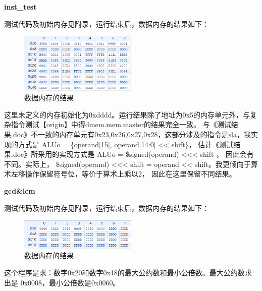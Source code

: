 \documentclass[10pt,a4paper,fleqn]{article}
\begin{document}
\par {\bf inst\_test}
\par 测试代码及初始内存见附录，运行结束后，数据内存的结果如下：
\begin{figure}[H]
  \centering
  \includegraphics[width=0.5\textwidth]{figure/simu/advance/inst.png}
  \caption{数据内存的结果}
\end{figure}
\par 这里未定义的内存初始化为0xdddd。运行结果除了地址为0x5的内存单元外，与复杂指令测试【origin】中得dmem.mem.master的结果完全一致。
与《测试结果.doc》不一致的内存单元有0x23,0x26,0x27,0x28，这部分涉及的指令是sla，我实现的方式是
{\consolas ALUo = \{operand[15], operand[14:0] << shift\}}， 估计《测试结果.doc》所采用的实现方式是
{\consolas ALUo = \$signed(operand) <<< shift }， 因此会有不同。实际上，
{\consolas \$signed(operand) <<< shift = operand << shift}。我更倾向于算术左移操作保留符号位，等价于算术上乘以2，
因此在这里保留不同结果。

\par {\bf gcd\&lcm}
\par 测试代码及初始内存见附录，运行结束后，数据内存的结果如下：
\begin{figure}[H]
  \centering
  \includegraphics[width=0.5\textwidth]{figure/simu/advance/gcdlcm.png}
  \caption{数据内存的结果}
\end{figure}
\par 这个程序是求：数字0x20和数字0x18的最大公约数和最小公倍数。最大公约数求出是  0x0008，最小公倍数是0x0060。
\end{document}
